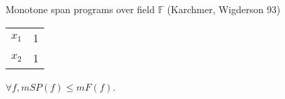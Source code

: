 \begin{frame}{Monotone span programs over field $\mathbb{F}$ (Karchmer, Wigderson 93)}
\begin{minipage}{0.5\linewidth}
\begin{center}
            \begin{tabular}{|c|c|}
                \hline
                $x_1$ & 1\\
                $x_2$ & 1\\
                \hline
            \end{tabular}
        \end{center}
    \end{minipage}

    \pause
    \begin{lemma}
        $\forall f, mSP(f) \le mF(f)$.
    \end{lemma}
\end{frame}